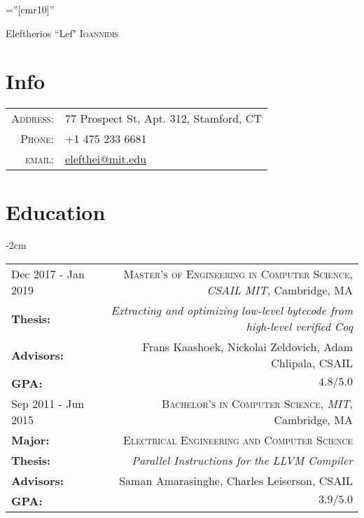 \documentclass[lettersize,10pt]{article}
\begin{document}
\pagestyle{empty} %
\font\fb=''[cmr10]'' %

\par{\centering
		{\Huge Eleftherios ``Lef" \textsc{Ioannidis}
	}
	\bigskip\par}

\section{Info}

\begin{tabularx}{\textwidth}{rl}
    \textsc{Address:}   & 77 Prospect St, Apt. 312, Stamford, CT \\
    \textsc{Phone:}     & +1 475 233 6681\\
    \textsc{email:}     & \href{mailto:elefthei@mit.edu}{elefthei@mit.edu}
\end{tabularx}

\section{Education}
\begin{adjustwidth}{}{-2cm}
  \begin{tabularx}{\textwidth}{L R}
	Dec 2017 - Jan 2019 & \textsc{Master's of Engineering in Computer Science}, \emph{CSAIL MIT}, Cambridge, MA\\
    \textbf{Thesis:}    & \emph{Extracting and optimizing low-level bytecode from high-level verified Coq} \\
	\textbf{Advisors:}  & Frans Kaashoek, Nickolai Zeldovich, Adam Chlipala, CSAIL \\
	\textbf{GPA:}       & $4.8/5.0$ \\

	Sep 2011 - Jun 2015 & \textsc{Bachelor's in Computer Science}, \emph{MIT}, Cambridge, MA\\
	\textbf{Major:}     & \textsc{Electrical Engineering and Computer Science} \\
	\textbf{Thesis:}    & \emph{Parallel Instructions for the LLVM Compiler} \\
	\textbf{Advisors:}  & Saman Amarasinghe, Charles Leiserson, CSAIL \\
	\textbf{GPA:}       & $3.9/5.0$ \\
  \end{tabularx}
\end{adjustwidth}
\end{document}
